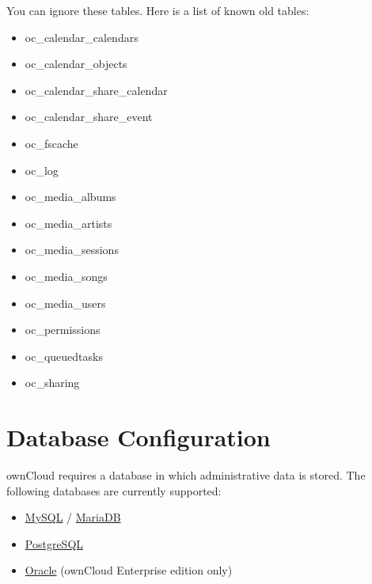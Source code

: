 \documentclass[letterpaper,10pt,english]{sphinxmanual}
\begin{document}
You can ignore these tables.
Here is a list of known old tables:
\begin{itemize}
\item {} 
oc\_calendar\_calendars

\item {} 
oc\_calendar\_objects

\item {} 
oc\_calendar\_share\_calendar

\item {} 
oc\_calendar\_share\_event

\item {} 
oc\_fscache

\item {} 
oc\_log

\item {} 
oc\_media\_albums

\item {} 
oc\_media\_artists

\item {} 
oc\_media\_sessions

\item {} 
oc\_media\_songs

\item {} 
oc\_media\_users

\item {} 
oc\_permissions

\item {} 
oc\_queuedtasks

\item {} 
oc\_sharing

\end{itemize}


\section{Database Configuration}
\label{configuration_database/linux_database_configuration:database-configuration}\label{configuration_database/linux_database_configuration::doc}
ownCloud requires a database in which administrative data is stored. The following databases are currently supported:
\begin{itemize}
\item {} 
\href{http://www.mysql.com/}{MySQL} / \href{https://mariadb.org/}{MariaDB}

\item {} 
\href{http://www.postgresql.org/}{PostgreSQL}

\item {} 
\href{http://www.oracle.com/}{Oracle} (ownCloud Enterprise edition only)

\end{itemize}
\end{document}

